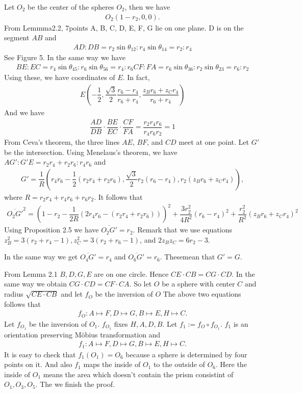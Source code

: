 \documentclass[dvipdfmx]{interact}
\theoremstyle{plain}%
\theoremstyle{definition}
\theoremstyle{remark}
\theoremstyle{problemstyle}
\begin{document}
Let $O_2$ be the center of the spheres $O_2$, then we have
\begin{align*}
 O_2(1 - r_2, 0, 0).
\end{align*}
From Lemmma2.2, 7points A, B, C, D, E, F, G lie on one plane. D is on
the segment $AB$ and
\begin{align*}
 AD : DB = r_2\sin\theta_{12} : r_4\sin\theta_{14} = r_2 : r_4
\end{align*}
See Figure 5. In the same way we have
\begin{align*}
 BE : EC = r_4\sin\theta_{45} : r_6\sin\theta_{56} = r_4:r_6
 CF : FA = r_6\sin\theta_{36} : r_2\sin\theta_{23} = r_6:r_2
\end{align*}
Using these, we have coordinates of $E$. In fact,
\begin{align*}
 E(-\dfrac{1}{2},\dfrac{\sqrt{3}}{2}\dfrac{r_6-r_4}{r_6 + r_4},
 \dfrac{z_Br_6 + z_C r_4}{r_6 + r_4})
\end{align*}
And we have
\begin{align*}
 \dfrac{AD}{DB} \cdot \dfrac{BE}{EC} \cdot \dfrac{CF}{FA} = \dfrac{r_2r_4r_6}{r_4r_6r_2} = 1
\end{align*}
From Ceva's theorem, the three lines $AE$, $BF$, and $CD$ meet at one
point. Let $G'$ be the intersection. Using Menelaus's theorem, we have
$AG':G'E = r_2r_4 + r_2r_6:r_4r_6$ and
\begin{align*}
 G' = \dfrac{1}{R}(r_4r_6 - \dfrac{1}{2}(r_2r_4 + r_2r_6), 
 \dfrac{\sqrt{3}}{2}r_2(r_6 - r_4), r_2(z_Br_6 + z_Cr_4)),
\end{align*}
where $R = r_2r_4 + r_4r_6 + r_6r_2.$ It follows that
\begin{align*}
 \overline{O_2G'}^2 = (1 - r_2 - \dfrac{1}{2R}(2r_4r_6 - (r_2r_4 +
 r_2r_6)))^2 + \dfrac{3r^2_2}{4R^2}(r_6 - r_4)^2 +
 \dfrac{r_2^2}{R^2}(z_Br_6 + z_Cr_4)^2
\end{align*}
Using Proposition 2.5 we have $\overline{O_2G'} = r_2$. Remark that we
use equations $z_B^2 = 3(r_2 + r_4 - 1), z_C^2 = 3(r_2 + r_6 - 1)$, and
$2z_Bz_C = 6r_2 - 3$.

In the same way we get $\overline{O_4G'} = r_4$ and 
$\overline{O_6G'} = r_6$. Thesemean that $G' = G$.

From Lemma 2.1 $B, D, G, E$ are on one circle. Hence
$CE \cdot CB = CG \cdot CD$. In the same way we obtain 
$CG \cdot CD = CF \cdot CA$. So let $O$ be a sphere with center $C$ and
radius $\sqrt{CE \cdot CB}$ and let $f_O$ be the inversion of $O$
The above two equations follows that
\begin{align*}
 f_O: A \mapsto F, D \mapsto G, B \mapsto E, H \mapsto C.
\end{align*}
Let $f_{O_1}$ be the inversion of $O_1$. $f_{O_1}$ fixes $H, A, D, B$.
Let $f_1 := f_O \circ f_{O_1}$.
$f_1$ is an orientation preserving M\"obius transformation and
\begin{align*}
 f_1 : A \mapsto F, D \mapsto G, B \mapsto E, H \mapsto C.
\end{align*}
It is easy to check that $f_1(O_1) = O_6$ because a sphere is determined
by four points on it. And also $f_1$ maps the inside of $O_1$ to the
outside of $O_6$. Here the inside of $O_1$ means the area which doesn't
contain the prism consistint of $O_1, O_3, O_5$. The we finish the
proof.
\end{document}
